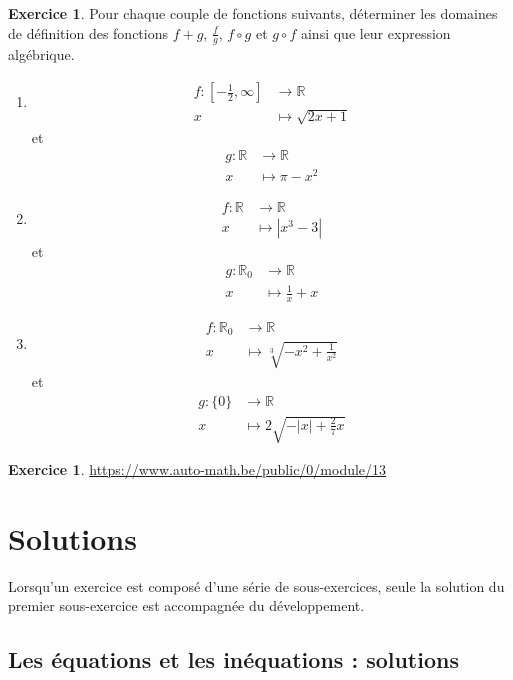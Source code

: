 \documentclass[a4paper,13pt]{scrreprt}
\theoremstyle{plain}
\theoremstyle{definition}
\newtheorem{exo}[subsection]{Exercice}
\newcommand{\rr}{\mathbb{R}}
\begin{document}
\begin{exo} \label{exof28}
 Pour chaque couple de fonctions suivants, déterminer les domaines de définition des fonctions $f+g$, $\frac{f}{g}$, $f \circ g$ et $g\circ f$ ainsi que leur expression algébrique.
  \begin{enumerate}
  	\item \begin{align*}
  	f : [-\frac{1}{2},\infty] &\to \rr \\
  	x &\mapsto \sqrt{2x+1}
  	\end{align*}
  	et
  	\begin{align*}
  	g : \rr &\to \rr \\
  	x &\mapsto \pi - x^2
  	\end{align*}
  	\item \begin{align*}
  	f : \rr &\to \rr \\
  	x &\mapsto |x^3-3|
  	\end{align*}
  	et
  	\begin{align*}
  	g : {\rr}_{0} &\to \rr \\
  	x &\mapsto \frac{1}{x}+x
  	\end{align*}
  \item \begin{align*}
  f : {\rr}_{0} &\to \rr \\
  x &\mapsto \sqrt[3]{-x^2+\frac{1}{x^2}}
  \end{align*}
  et
  \begin{align*}
  g : \{0\} &\to \rr \\
  x &\mapsto 2\sqrt{-|x|+\frac{2}{7}x}
  \end{align*}
\end{enumerate}
\end{exo}

\begin{exo} \label{exof25}
	\url{https://www.auto-math.be/public/0/module/13}
\end{exo}

\chapter{Solutions}

Lorsqu'un exercice est composé d'une série de sous-exercices, seule la solution du premier sous-exercice est accompagnée du développement.
\section{Les équations et les inéquations : solutions}
\end{document}
